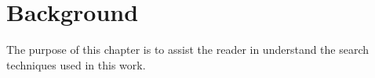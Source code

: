 \chapter{Background}

The purpose of this chapter is to assist the reader in understand the search techniques used in this work.







